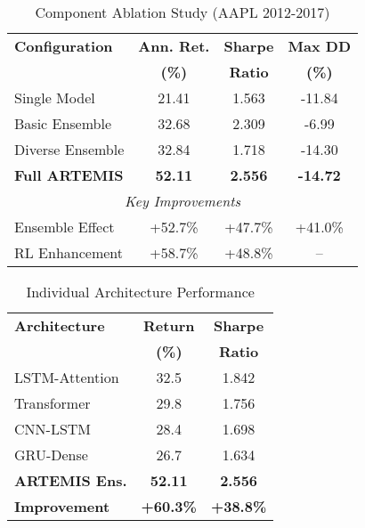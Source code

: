 \documentclass[10pt,twocolumn]{article}
\begin{document}
\begin{table}[t]
\centering
\caption{Component Ablation Study (AAPL 2012-2017)}
\label{tab:table4_ablation_study}
\small
\begin{tabular}{p{2.8cm}ccc}
\toprule
\textbf{Configuration} & \textbf{Ann. Ret.} & \textbf{Sharpe} & \textbf{Max DD} \\
 & \textbf{(\%)} & \textbf{Ratio} & \textbf{(\%)} \\
\midrule
Single Model & 21.41 & 1.563 & -11.84 \\
Basic Ensemble & 32.68 & 2.309 & -6.99 \\
Diverse Ensemble & 32.84 & 1.718 & -14.30 \\
\textbf{Full ARTEMIS} & \textbf{52.11} & \textbf{2.556} & \textbf{-14.72} \\
\midrule
\multicolumn{4}{c}{\textit{Key Improvements}} \\
\midrule
Ensemble Effect & +52.7\% & +47.7\% & +41.0\% \\
RL Enhancement & +58.7\% & +48.8\% & -- \\
\bottomrule
\end{tabular}
\end{table}

\begin{table}[!ht]
\centering
\caption{Individual Architecture Performance}
\label{tab:table5_network_ablation}
\footnotesize
\begin{tabular}{p{2.2cm}cc}
\toprule
\textbf{Architecture} & \textbf{Return} & \textbf{Sharpe} \\
 & \textbf{(\%)} & \textbf{Ratio} \\
\midrule
LSTM-Attention & 32.5 & 1.842 \\
Transformer & 29.8 & 1.756 \\
CNN-LSTM & 28.4 & 1.698 \\
GRU-Dense & 26.7 & 1.634 \\
\midrule
\textbf{ARTEMIS Ens.} & \textbf{52.11} & \textbf{2.556} \\
\textbf{Improvement} & \textbf{+60.3\%} & \textbf{+38.8\%} \\
\bottomrule
\end{tabular}
\end{table}
\end{document}
